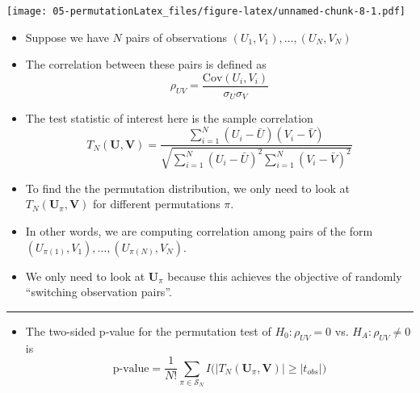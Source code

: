 \documentclass[]{book}
\providecommand{\tightlist}{%
  \setlength{\itemsep}{0pt}\setlength{\parskip}{0pt}}
\begin{document}
\texttt{[image: 05-permutationLatex\_files/figure-latex/unnamed-chunk-8-1.pdf]}

\begin{itemize}
\item
  Suppose we have \(N\) pairs of observations \((U_{1}, V_{1}), \ldots, (U_{N}, V_{N})\)
\item
  The correlation between these pairs is defined as
  \begin{equation}
  \rho_{UV} = \frac{\textrm{Cov}(U_{i}, V_{i})}{\sigma_{U}\sigma_{V}}
  \end{equation}
\item
  The test statistic of interest here is the sample correlation
  \begin{equation}
  T_{N}(\mathbf{U}, \mathbf{V}) = \frac{\sum_{i=1}^{N}(U_{i} - \bar{U})(V_{i} - \bar{V})}{\sqrt{ \sum_{i=1}^{N}(U_{i} - \bar{U})^{2}\sum_{i=1}^{N}(V_{i} - \bar{V})^{2}} }
  \end{equation}
\item
  To find the the permutation distribution, we only need to look
  at \(T_{N}(\mathbf{U}_{\pi}, \mathbf{V})\) for different permutations \(\pi\).
\item
  In other words, we are computing correlation among pairs
  of the form \((U_{\pi(1)}, V_{1}), \ldots, (U_{\pi(N)}, V_{N})\).
\item
  We only need to look at \(\mathbf{U}_{\pi}\) because this achieves the objective
  of randomly ``switching observation pairs''.
\end{itemize}

\begin{center}\rule{0.5\linewidth}{\linethickness}\end{center}

\begin{itemize}
\tightlist
\item
  The two-sided p-value for the permutation test of \(H_{0}: \rho_{UV} = 0\) vs. \(H_{A}: \rho_{UV} \neq 0\) is
  \begin{equation}
  \textrm{p-value} 
  = \frac{1}{N!} \sum_{\pi \in \mathcal{S}_{N}} I\Big( \Big| T_{N}(\mathbf{U}_{\pi}, \mathbf{V}) \Big|  \geq |t_{obs}| \Big) \nonumber
  \end{equation}
\end{itemize}
\end{document}
